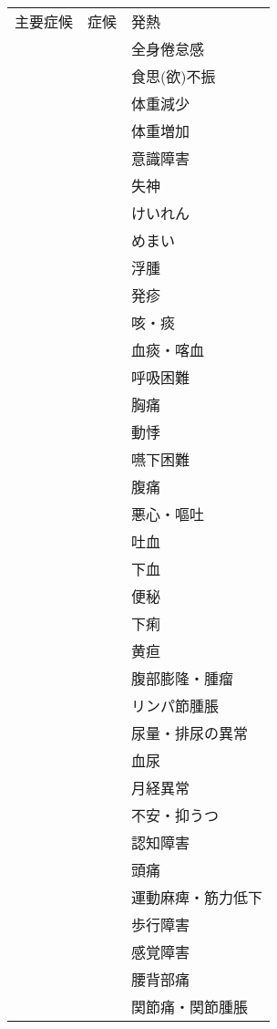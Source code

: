 \documentclass[
]{ltjsarticle}
\begin{document}
\begin{xltabular}{\linewidth}{XXX}
主要症候 & 症候 & 発熱 \\
 &  & 全身倦怠感 \\
 &  & 食思(欲)不振 \\
 &  & 体重減少 \\
 &  & 体重増加 \\
 &  & 意識障害 \\
 &  & 失神 \\
 &  & けいれん \\
 &  & めまい \\
 &  & 浮腫 \\
 &  & 発疹 \\
 &  & 咳・痰 \\
 &  & 血痰・喀血 \\
 &  & 呼吸困難 \\
 &  & 胸痛 \\
 &  & 動悸 \\
 &  & 嚥下困難 \\
 &  & 腹痛 \\
 &  & 悪心・嘔吐 \\
 &  & 吐血 \\
 &  & 下血 \\
 &  & 便秘 \\
 &  & 下痢 \\
 &  & 黄疸 \\
 &  & 腹部膨隆・腫瘤 \\
 &  & リンパ節腫脹 \\
 &  & 尿量・排尿の異常 \\
 &  & 血尿 \\
 &  & 月経異常 \\
 &  & 不安・抑うつ \\
 &  & 認知障害 \\
 &  & 頭痛 \\
 &  & 運動麻痺・筋力低下 \\
 &  & 歩行障害 \\
 &  & 感覚障害 \\
 &  & 腰背部痛 \\
 &  & 関節痛・関節腫脹 \\
\bottomrule
\end{xltabular}
\end{document}
